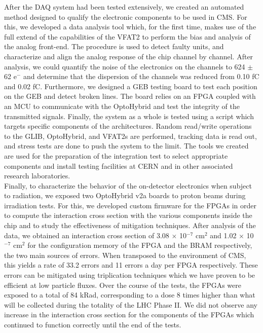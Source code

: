   After the DAQ system had been tested extensively, we created an automated method designed to qualify the electronic components to be used in CMS. For this, we developed a data analysis tool which, for the first time, makes use of the full extend of the capabilities of the VFAT2 to perform the bias and analysis of the analog front-end. The procedure is used to detect faulty units, and characterize and align the analog response of the chip channel by channel. After analysis, we could quantify the noise of the electronics on the channels to 624 $\pm$ 62 e$^-$ and determine that the dispersion of the channels was reduced from 0.10 fC and 0.02 fC. Furthermore, we designed a GEB testing board to test each position on the GEB and detect broken lines. The board relies on an FPGA coupled with an MCU to communicate with the OptoHybrid and test the integrity of the transmitted signals. Finally, the system as a whole is tested using a script which targets specific components of the architectures. Random read/write operations to the GLIB, OptoHybrid, and VFAT2s are performed, tracking data is read out, and stress tests are done to push the system to the limit. The tools we created are used for the preparation of the integration test to select appropriate components and install testing facilities at CERN and in other associated research laboratories. \\

  Finally, to characterize the behavior of the on-detector electronics when subject to radiation, we exposed two OptoHybrid v2a boards to proton beams during irradiation tests. For this, we developed custom firmware for the FPGAs in order to compute the interaction cross section with the various components inside the chip and to study the effectiveness of mitigation techniques. After analysis of the data, we obtained an interaction cross section of 3.08 $ \times $ 10$^{-7}$ cm$^{2}$ and 1.02 $ \times $ 10$^{-7}$ cm$^{2}$ for the configuration memory of the FPGA and the BRAM respectively, the two main sources of errors. When transposed to the environment of CMS, this yields a rate of 33.2 errors and 11 errors a day per FPGA respectively. These errors can be mitigated using triplication techniques which we have proven to be efficient at low particle fluxes. Over the course of the tests, the FPGAs were exposed to a total of 84 kRad, corresponding to a dose 8 times higher than what will be collected during the totality of the LHC Phase II. We did not observe any increase in the interaction cross section for the components of the FPGAs which continued to function correctly until the end of the tests. \\

